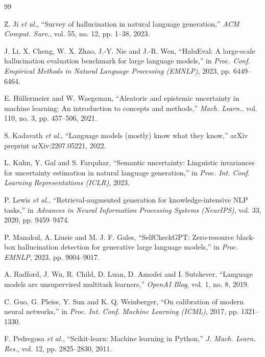 \documentclass[conference]{IEEEtran}
\begin{document}
\begin{thebibliography}{99}

Z. Ji \emph{et al.}, ``Survey of hallucination in natural language generation,''
\emph{ACM Comput. Surv.}, vol. 55, no. 12, pp. 1--38, 2023.

J. Li, X. Cheng, W. X. Zhao, J.-Y. Nie and J.-R. Wen, ``HaluEval: A large-scale
hallucination evaluation benchmark for large language models,'' in \emph{Proc.
Conf. Empirical Methods in Natural Language Processing (EMNLP)}, 2023,
pp. 6449--6464.

E. H\"{u}llermeier and W. Waegeman, ``Aleatoric and epistemic uncertainty in
machine learning: An introduction to concepts and methods,'' \emph{Mach. Learn.},
vol. 110, no. 3, pp. 457--506, 2021.

S. Kadavath \emph{et al.}, ``Language models (mostly) know what they know,''
arXiv preprint arXiv:2207.05221, 2022.

L. Kuhn, Y. Gal and S. Farquhar, ``Semantic uncertainty: Linguistic invariances
for uncertainty estimation in natural language generation,'' in \emph{Proc. Int.
Conf. Learning Representations (ICLR)}, 2023.

P. Lewis \emph{et al.}, ``Retrieval-augmented generation for knowledge-intensive
NLP tasks,'' in \emph{Advances in Neural Information Processing Systems
(NeurIPS)}, vol. 33, 2020, pp. 9459--9474.

P. Manakul, A. Liusie and M. J. F. Gales, ``SelfCheckGPT: Zero-resource
black-box hallucination detection for generative large language models,'' in
\emph{Proc. EMNLP}, 2023, pp. 9004--9017.

A. Radford, J. Wu, R. Child, D. Luan, D. Amodei and I. Sutskever, ``Language
models are unsupervised multitask learners,'' \emph{OpenAI Blog}, vol. 1, no. 8,
2019.

C. Guo, G. Pleiss, Y. Sun and K. Q. Weinberger, ``On calibration of modern
neural networks,'' in \emph{Proc. Int. Conf. Machine Learning (ICML)}, 2017,
pp. 1321--1330.

F. Pedregosa \emph{et al.}, ``Scikit-learn: Machine learning in Python,''
\emph{J. Mach. Learn. Res.}, vol. 12, pp. 2825--2830, 2011.


\end{thebibliography}
\end{document}

